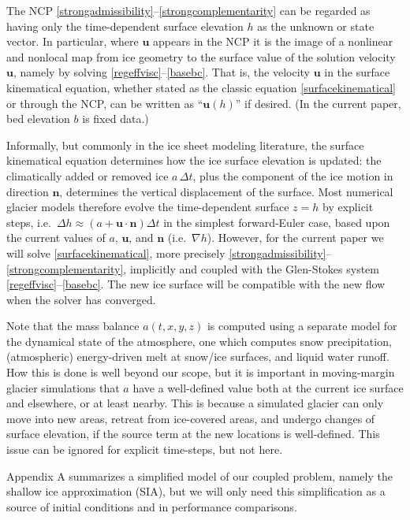 \documentclass[letterpaper,final,12pt,reqno]{amsart}
\newcommand{\grad}{\nabla}
\newcommand{\bn}{\mathbf{n}}
\newcommand{\bu}{\mathbf{u}}
\begin{document}
The NCP \eqref{strongadmissibility}--\eqref{strongcomplementarity} can be regarded as having only the time-dependent surface elevation $h$ as the unknown or state vector.  In particular, where $\bu$ appears in the NCP it is the image of a nonlinear and nonlocal map from ice geometry to the surface value of the solution velocity $\bu$, namely by solving \eqref{regeffvisc}--\eqref{basebc}.  That is, the velocity $\bu$ in the surface kinematical equation, whether stated as the classic equation \eqref{surfacekinematical} or through the NCP, can be written as ``$\bu(h)$'' if desired.  (In the current paper, bed elevation $b$ is fixed data.)

Informally, but commonly in the ice sheet modeling literature, the surface kinematical equation determines how the ice surface elevation is updated: the climatically added or removed ice $a\,\Delta t$, plus the component of the ice motion in direction $\bn$, determines the vertical displacement of the surface.  Most numerical glacier models therefore evolve the time-dependent surface $z=h$ by explicit steps, i.e.~$\Delta h \approx \left(a + \bu\cdot \bn\right) \Delta t$ in the simplest forward-Euler case, based upon the current values of $a$, $\bu$, and $\bn$ (i.e.~$\grad h$).  However, for the current paper we will solve \eqref{surfacekinematical}, more precisely \eqref{strongadmissibility}--\eqref{strongcomplementarity}, implicitly and coupled with the Glen-Stokes system \eqref{regeffvisc}--\eqref{basebc}.  The new ice surface will be compatible with the new flow when the solver has converged.

Note that the mass balance $a(t,x,y,z)$ is computed using a separate model for the dynamical state of the atmosphere, one which computes snow precipitation, (atmospheric) energy-driven melt at snow/ice surfaces, and liquid water runoff.  How this is done is well beyond our scope, but it is important in moving-margin glacier simulations that $a$ have a well-defined value both at the current ice surface and elsewhere, or at least nearby.  This is because a simulated glacier can only move into new areas, retreat from ice-covered areas, and undergo changes of surface elevation, if the source term at the new locations is well-defined.  This issue can be ignored for explicit time-steps, but not here.

Appendix A summarizes a simplified model of our coupled problem, namely the shallow ice approximation (SIA), but we will only need this simplification as a source of initial conditions and in performance comparisons.
\end{document}
